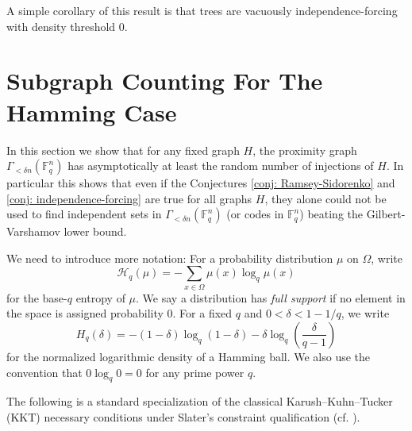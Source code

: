\documentclass[12pt]{article}
\newcommand{\Fq}{\mathbb{F}_q}
\begin{document}
A simple corollary of this result is that trees are vacuously independence-forcing with density threshold 0.









\section{Subgraph Counting For The Hamming Case}

In this section we show that for any fixed graph $H$, the proximity graph $\Gamma_{<\delta n}(\Fq^n)$ has asymptotically at least the random number of injections of $H$. In particular this shows that even if the Conjectures \ref{conj: Ramsey-Sidorenko} and \ref{conj: independence-forcing} are true for all graphs $H$, they  alone could not be used to find independent sets in $\Gamma_{<\delta n}(\Fq^n)$ (or codes in $\Fq^n$) beating the Gilbert-Varshamov lower bound. 



We need to introduce more notation: For a probability distribution $\mu$ on $\Omega$, write
\[
\mathcal H_q(\mu)=-\sum_{x\in\Omega}\mu(x)\log_q\mu(x)
\]
for the base-$q$ entropy of $\mu$. We say a distribution has \textit{full support} if no element in the space is assigned probability 0. For a fixed $q$ and $0<\delta<1-1/q$, we  write 
\[
H_q(\delta)=-(1-\delta)\log_q(1-\delta)-\delta\log_q\left(\frac{\delta}{q-1}\right)
\]
for the normalized logarithmic density of a Hamming ball. We also use the convention that $0\log_q0=0$ for any prime power $q$.



The following is a standard specialization of the classical Karush--Kuhn--Tucker (KKT)  necessary conditions under Slater's constraint qualification (cf. \cite[Theorem L7.4]{farina2025kkt}).
\end{document}
